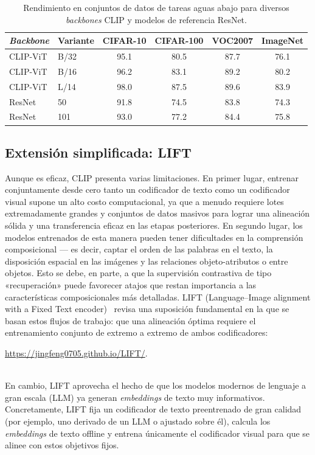 \documentclass[../../book-main_es.tex]{subfiles}
\begin{document}
\begin{table}[htbp]
\centering
\begin{tabular}{@{}llcccc@{}}
\toprule
\textit{Backbone} & Variante & CIFAR-10 & CIFAR-100 & VOC2007 & ImageNet \\
\midrule
CLIP-ViT & B/32 & 95.1 & 80.5 & 87.7 & 76.1 \\
CLIP-ViT & B/16 & 96.2 & 83.1 & 89.2 & 80.2 \\
CLIP-ViT & L/14 & 98.0 & 87.5 & 89.6 & 83.9 \\
\midrule
ResNet & 50  & 91.8 & 74.5 & 83.8 & 74.3 \\
ResNet & 101 & 93.0 & 77.2 & 84.4 & 75.8 \\
\bottomrule
\end{tabular}
\caption{Rendimiento en conjuntos de datos de tareas aguas abajo para diversos \textit{backbones} CLIP y modelos de referencia ResNet.}
\label{tab:clip_vs_resnet}
\end{table}

\subsection{Extensión simplificada: LIFT}\label{sub:follow-up}

Aunque es eficaz, CLIP presenta varias limitaciones. En primer lugar, entrenar conjuntamente 
desde cero tanto un codificador de texto como un codificador visual supone un alto costo
computacional, ya que a menudo requiere lotes extremadamente grandes y conjuntos de datos masivos 
para lograr una alineación sólida y una transferencia eficaz en las etapas posteriores. En segundo 
lugar, los modelos entrenados de esta manera pueden tener dificultades en la comprensión 
composicional --- es decir, captar el orden de las palabras en el texto, la disposición espacial 
en las imágenes y las relaciones objeto-atributos o entre objetos. Esto se debe, en 
parte, a que la supervisión contrastiva de tipo «recuperación» puede favorecer atajos 
que restan importancia a las características composicionales más detalladas. LIFT 
(Language–Image alignment with a Fixed Text encoder)~\citep{yang2025languageimagealignmentfixedtext} 
revisa una suposición fundamental en la que se basan estos flujos de trabajo: que una alineación 
óptima requiere el entrenamiento conjunto de extremo a extremo de ambos codificadores:\\
\centerline{\url{https://jingfeng0705.github.io/LIFT/}.}\\
En cambio, LIFT aprovecha el hecho de que los modelos modernos de lenguaje a gran escala (LLM) 
ya generan \textit{embeddings} de texto muy informativos. Concretamente, LIFT fija un codificador 
de texto preentrenado de gran calidad (por ejemplo, uno derivado de un LLM o ajustado sobre él), 
calcula los \textit{embeddings} de texto offline y entrena únicamente el codificador visual 
para que se alinee con estos objetivos fijos.
\end{document}
